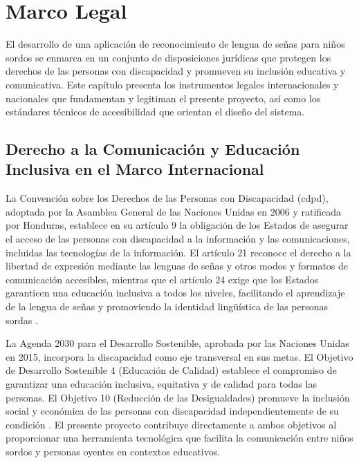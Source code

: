 \chapter[Marco Legal]{Marco Legal}
\label{ch:marco-legal}

\insertminitoc
\parindent0pt

El desarrollo de una aplicación de reconocimiento de lengua de señas para niños sordos se
enmarca en un conjunto de disposiciones jurídicas que protegen los derechos de las personas
con discapacidad y promueven su inclusión educativa y comunicativa. Este capítulo presenta
los instrumentos legales internacionales y nacionales que fundamentan y legitiman el
presente proyecto, así como los estándares técnicos de accesibilidad que orientan el diseño
del sistema.

\section{Derecho a la Comunicación y Educación Inclusiva en el Marco Internacional}

La Convención sobre los Derechos de las Personas con Discapacidad (\acrshort{cdpd}), adoptada por la
Asamblea General de las Naciones Unidas en 2006 y ratificada por Honduras, establece en su
artículo 9 la obligación de los Estados de asegurar el acceso de las personas con
discapacidad a la información y las comunicaciones, incluidas las tecnologías de la
información. El artículo 21 reconoce el derecho a la libertad de expresión mediante las
lenguas de señas y otros modos y formatos de comunicación accesibles, mientras que el
artículo 24 exige que los Estados garanticen una educación inclusiva a todos los niveles,
facilitando el aprendizaje de la lengua de señas y promoviendo la identidad lingüística de
las personas sordas \cite{onu_cdpd_2006}.

La Agenda 2030 para el Desarrollo Sostenible, aprobada por las Naciones Unidas en 2015,
incorpora la discapacidad como eje transversal en sus metas. El Objetivo de Desarrollo
Sostenible 4 (Educación de Calidad) establece el compromiso de garantizar una educación
inclusiva, equitativa y de calidad para todas las personas. El Objetivo 10 (Reducción de
las Desigualdades) promueve la inclusión social y económica de las personas con
discapacidad independientemente de su condición \cite{onu_agenda2030_2015}. El presente
proyecto contribuye directamente a ambos objetivos al proporcionar una herramienta
tecnológica que facilita la comunicación entre niños sordos y personas oyentes en contextos
educativos.

